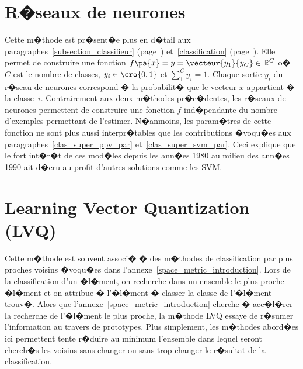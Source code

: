 \section{R�seaux de neurones}
\label{clas_super_nn_par}

Cette m�thode est pr�sent�e plus en d�tail aux paragraphes~\ref{subsection_classifieur} (page~\pageref{subsection_classifieur}) et~\ref{classification} (page~\pageref{classification}). Elle permet de construire une fonction $f\pa{x} = y = \vecteur{y_1}{y_C} \in \mathbb{R}^C$ o� $C$ est le nombre de classes, $y_i \in \cro{0,1}$ et $\sum^C_1 y_i = 1$. Chaque sortie $y_i$ du r�seau de neurones correspond � la probabilit� que le vecteur $x$ appartient � la classe~$i$. Contrairement aux deux m�thodes pr�c�dentes, les r�seaux de neurones permettent de construire une fonction $f$ ind�pendante du nombre d'exemples permettant de l'estimer. N�anmoins, les param�tres de cette fonction ne sont plus aussi interpr�tables que les contributions �voqu�es aux paragraphes~\ref{clas_super_ppv_par} et~\ref{clas_super_svm_par}. Ceci explique que le fort int�r�t de ces mod�les depuis les ann�es 1980 au milieu des ann�es 1990 ait d�cru au profit d'autres solutions comme les SVM.







\section{Learning Vector Quantization (LVQ)}

Cette m�thode est souvent associ� � des m�thodes de classification par plus proches voisins �voqu�es dans l'annexe~\ref{space_metric_introduction}. Lors de la classification d'un �l�ment, on recherche dans un ensemble le plus proche �l�ment et on attribue � l'�l�ment � classer la classe de l'�l�ment trouv�. Alors que l'annexe~\ref{space_metric_introduction} cherche � acc�l�rer la recherche de l'�l�ment le plus proche, la m�thode LVQ essaye de r�sumer l'information au travers de prototypes. Plus simplement, les m�thodes abord�es ici permettent tente r�duire au minimum l'ensemble dans lequel seront cherch�s les voisins sans changer ou sans trop changer le r�sultat de la classification. 


